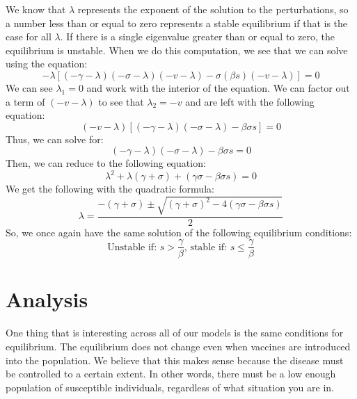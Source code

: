 \documentclass[12pt, a4paper]{article}
\begin{document}
        We know that $\lambda$ represents the exponent of the solution to the perturbations, so a number less than or equal to zero represents a stable equilibrium if that is the case for all $\lambda$. If there is a single eigenvalue greater than or equal to zero, the equilibrium is unstable. When we do this computation, we see that we can solve using the equation:
        \[
        -\lambda [(-\gamma-\lambda)(-\sigma-\lambda)(-v-\lambda)-\sigma(\beta s)(-v-\lambda)]=0
        \]
        We can see $\lambda_1=0$ and work with the interior of the equation. We can factor out a term of $(-v-\lambda)$ to see that $\lambda_2=-v$ and are left with the following equation:
        \[
        (-v-\lambda)[(-\gamma-\lambda)(-\sigma-\lambda)-\beta\sigma s]=0
        \]
        Thus, we can solve for: 
        \[
        (-\gamma-\lambda)(-\sigma-\lambda)-\beta\sigma s=0
        \]
        Then, we can reduce to the following equation:
        \[
        \lambda^2+\lambda(\gamma+\sigma)+(\gamma \sigma-\beta \sigma s)=0
        \]
        We get the following with the quadratic formula:
        \[
        \lambda = \frac{-(\gamma+\sigma)\pm \sqrt{(\gamma+\sigma)^2-4(\gamma \sigma-\beta \sigma s)}}{2}
        \]
        So, we once again have the same solution of the following equilibrium conditions:
        \[
        \mbox{Unstable if: }s > \frac{\gamma}{\beta} \mbox{, stable if: }s \leq \frac{\gamma}{\beta}
        \]
        
        
        
    
    
    \section{Analysis}
    
    
    One thing that is interesting across all of our models is the same conditions for equilibrium. The equilibrium does not change even when vaccines are introduced into the population. We believe that this makes sense because the disease must be controlled to a certain extent. In other words, there must be a low enough population of susceptible individuals, regardless of what situation you are in.
    
\end{document}
